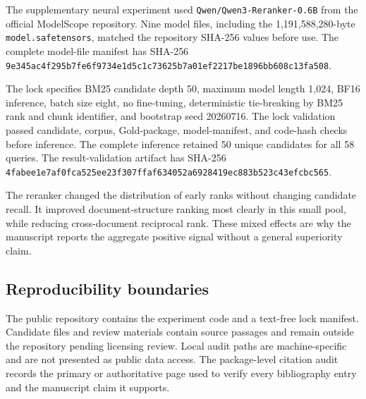 The supplementary neural experiment used \texttt{Qwen/Qwen3-Reranker-0.6B} from the official ModelScope repository. Nine model files, including the 1,191,588,280-byte \texttt{model.safetensors}, matched the repository SHA-256 values before use. The complete model-file manifest has SHA-256 \texttt{9e345ac4f295b7fe6f9734e1d5c1c73625b7a01ef2217be1896bb608c13fa508}.

The lock specifies BM25 candidate depth 50, maximum model length 1,024, BF16 inference, batch size eight, no fine-tuning, deterministic tie-breaking by BM25 rank and chunk identifier, and bootstrap seed 20260716. The lock validation passed candidate, corpus, Gold-package, model-manifest, and code-hash checks before inference. The complete inference retained 50 unique candidates for all 58 queries. The result-validation artifact has SHA-256 \texttt{4fabee1e7af0fca525ee23f307ffaf634052a6928419ec883b523c43efcbc565}.



The reranker changed the distribution of early ranks without changing candidate recall. It improved document-structure ranking most clearly in this small pool, while reducing cross-document reciprocal rank. These mixed effects are why the manuscript reports the aggregate positive signal without a general superiority claim.

\subsection{Reproducibility boundaries}

The public repository contains the experiment code and a text-free lock manifest. Candidate files and review materials contain source passages and remain outside the repository pending licensing review. Local audit paths are machine-specific and are not presented as public data access. The package-level citation audit records the primary or authoritative page used to verify every bibliography entry and the manuscript claim it supports.
